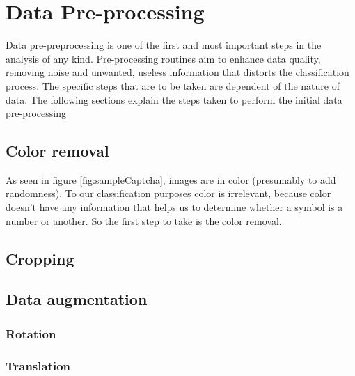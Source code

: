 \chapter{Data Pre-processing}
\label{chap:preprocessing}
Data pre-preprocessing is one of the first and most important steps in the analysis of any kind. Pre-processing routines aim to enhance data quality, removing noise and unwanted, useless information that distorts the classification process. The specific steps that are to be taken are dependent of the nature of data. The following sections explain the steps taken to perform the initial data pre-processing

\section{Color removal}
\label{sec:colorRemoval}
As seen in figure \ref{fig:sampleCaptcha}, images are in color (presumably to add randomness). To our classification purposes color is irrelevant, because color doesn't have any information that helps us to determine whether a symbol is a number or another. So the first step to take is the color removal. 
\section{Cropping}

\section{Data augmentation}
    \subsection{Rotation}
    \subsection{Translation}